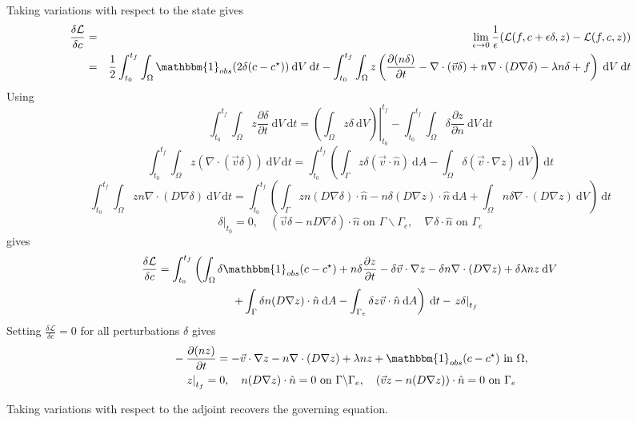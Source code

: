 \documentclass[12pt, letterpaper]{article}
\newcommand{\dA}{{\:\textrm{d}A}}
\newcommand{\dV}{{\:\textrm{d}V}}
\newcommand{\dt}{{\:\textrm{d}t}}
\begin{document}
Taking variations with respect to the state gives
\begin{eqnarray*}
\frac{\delta\mathcal{L}}{\delta c} &=& \lim_{\epsilon\to0}\frac{1}{\epsilon}(\mathcal{L}(f,c+\epsilon\delta,z)-\mathcal{L}(f,c,z)) \\
&=& \frac{1}{2}\int_{t_0}^{t_f}\int_\Omega\mathbbm{1}_{obs}(2\delta (c-c^\star)) \dV\dt - \int_{t_0}^{t_f}\int_\Omega z\left(\frac{\partial (n\delta)}{\partial t}-\nabla\cdot(\vec{v}\delta)+n\nabla\cdot (D\nabla \delta)-\lambda n \delta + f\right)\dV\dt
\end{eqnarray*}
Using
\[
\int_{t_0}^{t_f}\int_\Omega z\frac{\partial\delta}{\partial t} \dV\dt=\left.\left(\int_\Omega z\delta \dV\right)\right\vert^{t_f}_{t_0}-\int_{t_0}^{t_f}\int_\Omega \delta\frac{\partial z}{\partial n}\dV\dt
\]
\[
\int_{t_0}^{t_f}\int_\Omega z(\nabla\cdot(\vec{v}\delta)) \dV\dt = \int_{t_0}^{t_f}\left(\int_\Gamma z\delta(\vec{v}\cdot\hat{n}) \dA -\int_\Omega \delta (\vec{v}\cdot\nabla z) \dV\right)\dt
\]
\[
\int_{t_0}^{t_f}\int_\Omega zn\nabla\cdot(D\nabla\delta) \dV\dt = \int_{t_0}^{t_f}\left(\int_\Gamma zn(D\nabla\delta)\cdot\hat{n}-n\delta(D\nabla z)\cdot\hat{n}\dA + \int_\Omega n\delta\nabla\cdot(D\nabla z) \dV\right)\dt
\]
\[
\left.\delta\right\vert_{t_0}=0,\quad (\vec{v}\delta-nD\nabla\delta)\cdot\hat{n}\textrm{ on }\Gamma\backslash\Gamma_e,\quad\nabla\delta\cdot\hat{n}\textrm{ on }\Gamma_e
\]
gives
\begin{multline*}
\frac{\delta\mathcal{L}}{\delta c} = \int_{t_0}^{t_f}\left(\int_\Omega \delta\mathbbm{1}_{obs}(c-c^\star)+n\delta\frac{\partial z}{\partial t} - \delta\vec{v}\cdot\nabla z - \delta n \nabla\cdot(D\nabla z) + \delta\lambda nz \dV \right. \\
 \quad \left. + \int_\Gamma \delta n(D\nabla z)\cdot\hat{n} \dA - \int_{\Gamma_e} \delta z\vec{v}\cdot\hat{n} \dA\right)\dt -\left.z\delta\right\vert_{t_f}
\end{multline*}
Setting $\frac{\delta\mathcal{L}}{\delta c}=0$ for all perturbations $\delta$ gives
\begin{eqnarray*}
& -\frac{\partial (nz)}{\partial t} = -\vec{v}\cdot\nabla z - n\nabla\cdot(D\nabla z) + \lambda nz + \mathbbm{1}_{obs}(c-c^\star)\textrm{ in }\Omega,\\
& \quad \left.z\right\vert_{t_f}=0,
\quad n(D\nabla z)\cdot\hat{n}=0\textrm{ on }\Gamma\backslash\Gamma_e,
\quad (\vec{v}z-n(D\nabla z))\cdot\hat{n} = 0\textrm{ on }\Gamma_e
\end{eqnarray*}

Taking variations with respect to the adjoint recovers the governing equation.
\end{document}
